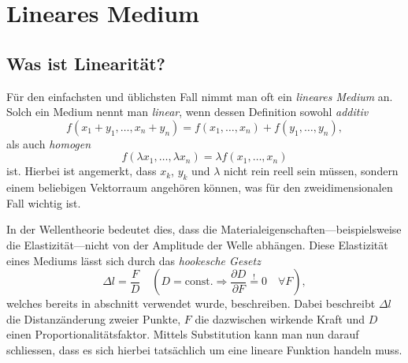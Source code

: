 %
%
%
%
\section{Lineares Medium\label{particles:section:linear}}

\subsection{Was ist Linearität?}
Für den einfachsten und üblichsten Fall nimmt man oft ein \emph{lineares Medium} an.
Solch ein Medium nennt man \emph{linear}, wenn dessen Definition sowohl \emph{additiv}
\[
    f(x_{1} + y_{1}, \ldots, x_{n} + y_{n}) 
    = 
    f(x_{1}, \ldots, x_{n}) 
    + 
    f(y_{1}, \ldots, y_{n}),
\]
als auch \emph{homogen}
\[
    f(\lambda x_{1}, \ldots, \lambda x_{n}) 
    = 
    \lambda f(x_{1}, \ldots, x_{n})
\]
ist.
Hierbei ist angemerkt, dass $x_{k}$, $y_{k}$ und $\lambda$ nicht rein reell sein müssen, 
sondern einem beliebigen Vektorraum angehören können, was für den zweidimensionalen Fall wichtig ist.

In der Wellentheorie bedeutet dies, 
dass die Materialeigenschaften---beispielsweise die Elastizität---nicht von der Amplitude der Welle abhängen.
Diese Elastizität eines Mediums lässt sich durch das \emph{hookesche Gesetz}
\[
    \Delta l
    = 
    \frac{F}{D}
    \quad
    \left(D = \text{const.} 
    \Rightarrow 
    \frac{\partial D}{\partial F} 
    \overset{!}{=} 
    0 
    \quad 
    \forall F \right)
    \label{particles:eq:hookesches-gesetz},
\]
welches bereits in abschnitt  verwendet wurde, beschreiben.
Dabei beschreibt $\Delta l$ die Distanzänderung zweier Punkte,
$F$ die dazwischen wirkende Kraft und $D$ einen Proportionalitätsfaktor.
Mittels Substitution kann man nun darauf schliessen, 
dass es sich hierbei tatsächlich um eine lineare Funktion handeln muss.


